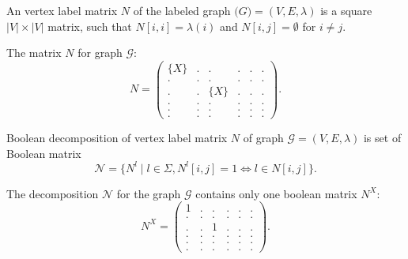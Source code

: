 \begin{definition}

An vertex label matrix $N$ of the labeled graph $\mathcal(G)=(V, E, \lambda)$ is a square $|V|\times|V|$ matrix, such that $N[i,i] = \lambda (i)$ and $N[i,j] = \emptyset$ for $i \neq j$.

\end{definition}

The matrix $N$ for graph $\mathcal{G}$:
$$
N = 
\begin{pmatrix}
    \{X\}     &   .   &   .       &   .   &   .   &   .   \\
    .         &   .   &   .       &   .   &   .   &   .   \\
    .         &   .   &   \{X\}   &   .   &   .   &   .   \\
    .         &   .   &   .       &   .   &   .   &   .   \\
    .         &   .   &   .       &   .   &   .   &   .   \\
    .         &   .   &   .       &   .   &   .   &   .
\end{pmatrix}.
$$

\begin{definition}

Boolean decomposition of vertex label matrix $N$ of graph $\mathcal{G}=(V, E, \lambda)$ is set of Boolean matrix $$\mathcal{N} = \{N^l \mid l \in \Sigma, N^l[i,j]=1 \iff l \in N[i,j]\}.$$

\end{definition}

The decomposition $\mathcal{N}$ for the graph $\mathcal{G}$ contains only one boolean matrix $N^X$:
$$
N^X = 
\begin{pmatrix}
    1     &   .   &   .   &   .   &   .   &   .   \\
    .     &   .   &   .   &   .   &   .   &   .   \\
    .     &   .   &   1   &   .   &   .   &   .   \\
    .     &   .   &   .   &   .   &   .   &   .   \\
    .     &   .   &   .   &   .   &   .   &   .   \\
    .     &   .   &   .   &   .   &   .   &   .
\end{pmatrix}.
$$


